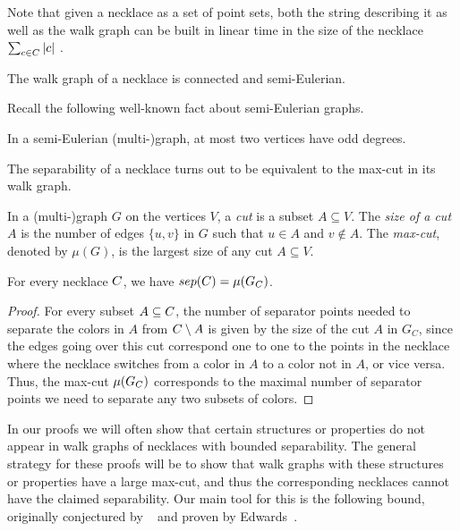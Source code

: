 \documentclass[a4paper,UKenglish,cleveref, thm-restate]{lipics-v2021}
\begin{document}
Note that given a necklace \Colors as a set of point sets, both the string describing it as well as the walk graph can be built in linear time in the size of the necklace $\sum_{c\in\Colors}|c|$ .


\begin{observation}\label{obs:semiEulerian}
The walk graph of a necklace is connected and semi-Eulerian.
\end{observation}

Recall the following well-known fact about semi-Eulerian graphs.
\begin{lemma}\label{lem:odddegrees}
    In a semi-Eulerian (multi-)graph, at most two vertices have odd degrees.
\end{lemma}


The separability of a necklace turns out to be equivalent to the max-cut in its walk graph.

\begin{definition}[Cut]
    In a (multi-)graph $G$ on the vertices $V$, a \emph{cut} is a subset $A\subseteq V$. The \emph{size of a cut} $A$ is the number of edges $\{u,v\}$ in $G$ such that $u\in A$ and $v\not\in A$. The \emph{max-cut}, denoted by $\mu(G)$, is the largest size of any cut $A\subseteq V$. 
\end{definition}
\begin{lemma}
    For every necklace $\Colors$, we have $sep(\Colors)=\mu(G_\Colors)$.
\end{lemma}
\begin{proof}
For every subset $A\subseteq \Colors$, the number of separator points needed to separate the colors in $A$ from $\Colors\setminus A$ is given by the size of the cut $A$ in $G_C$, since the edges going over this cut correspond one to one to the points in the necklace where the necklace switches from a color in $A$ to a color not in $A$, or vice versa. Thus, the max-cut $\mu(G_\Colors)$ corresponds to the maximal number of separator points we need to separate any two subsets of colors.
\end{proof}


In our proofs we will often show that certain structures or properties do not appear in walk graphs of necklaces with bounded separability. The general strategy for these proofs will be to show that walk graphs with these structures or properties have a large max-cut, and thus the corresponding necklaces cannot have the claimed separability. Our main tool for this is the following bound, originally conjectured by \erdos~\cite{erdosConjecture} and proven by Edwards~\cite{edwards_1,edwards_2}.
\end{document}
